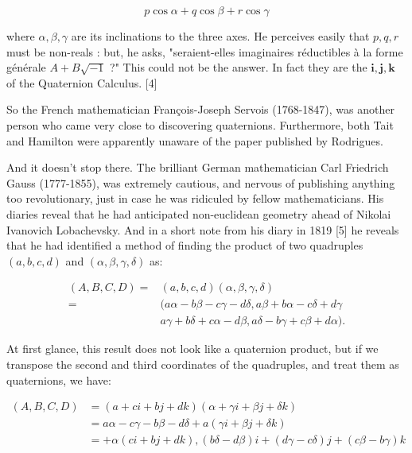 $$
    p \cos \alpha+q \cos \beta+r \cos \gamma
$$

where $\alpha, \beta, \gamma$ are its inclinations to the three axes. He perceives easily that $p, q, r$ must be non-reals : but, he asks, "seraient-elles imaginaires réductibles à la forme générale $A+B \sqrt{-1}$ ?" This could not be the answer. In fact they are the $\mathbf{i}, \mathbf{j}, \mathbf{k}$ of the Quaternion Calculus. [4]

So the French mathematician François-Joseph Servois (1768-1847), was another person who came very close to discovering quaternions. Furthermore, both Tait and Hamilton were apparently unaware of the paper published by Rodrigues.

And it doesn't stop there. The brilliant German mathematician Carl Friedrich Gauss (1777-1855), was extremely cautious, and nervous of publishing anything too revolutionary, just in case he was ridiculed by fellow mathematicians. His diaries reveal that he had anticipated non-euclidean geometry ahead of Nikolai Ivanovich Lobachevsky. And in a short note from his diary in 1819 [5] he reveals that he had identified a method of finding the product of two quadruples $(a, b, c, d)$ and $(\alpha, \beta, \gamma, \delta)$ as:

$$
    \begin{aligned}
        (A, B, C, D)= & (a, b, c, d)(\alpha, \beta, \gamma, \delta)                               \\
        =             & (a \alpha-b \beta-c \gamma-d \delta, a \beta+b \alpha-c \delta+d \gamma   \\
                      & a \gamma+b \delta+c \alpha-d \beta, a \delta-b \gamma+c \beta+d \alpha) .
    \end{aligned}
$$

At first glance, this result does not look like a quaternion product, but if we transpose the second and third coordinates of the quadruples, and treat them as quaternions, we have:

$$
    \begin{aligned}
        (A, B, C, D) & =(a+c i+b j+d k)(\alpha+\gamma i+\beta j+\delta k)                                    \\
                     & =a \alpha-c \gamma-b \beta-d \delta+a(\gamma i+\beta j+\delta k)                      \\
                     & =+\alpha(c i+b j+d k),(b \delta-d \beta) i+(d \gamma-c \delta) j+(c \beta-b \gamma) k
    \end{aligned}
$$

